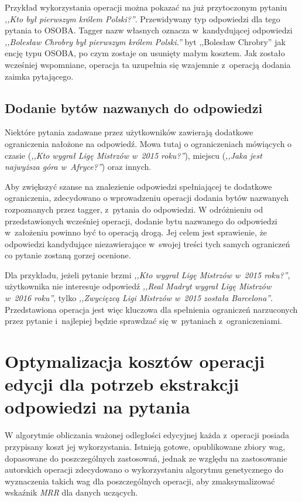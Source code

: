 \documentclass[a4paper, twoside, openright, 12pt]{report}
\begin{document}
            Przykład wykorzystania operacji można pokazać na już przytoczonym pytaniu \emph{,,Kto był pierwszym królem Polski?''}.
            Przewidywany typ odpowiedzi dla tego pytania to OSOBA. Tagger nazw własnych oznacza w~kandydującej odpowiedzi
            \emph{,,Bolesław Chrobry był pierwszym królem Polski.''} byt ,,Bolesław Chrobry'' jak encję typu OSOBA,
            po czym zostaje on usunięty małym kosztem. Jak zostało wcześniej wspomniane, operacja ta uzupełnia się wzajemnie
            z~operacją dodania zaimka pytającego.

        \subsection{Dodanie bytów nazwanych do odpowiedzi}
            Niektóre pytania zadawane przez użytkowników zawierają dodatkowe ograniczenia nałożone na odpowiedź. Mowa tutaj
            o ograniczeniach mówiących o czasie (\emph{,,Kto wygrał Ligę Mistrzów w~2015 roku?''}), miejscu
            (\emph{,,Jaka jest najwyższa góra w~Afryce?''}) oraz innych.

            Aby zwiększyć szanse na znalezienie odpowiedzi spełniającej te dodatkowe ograniczenia, zdecydowano o wprowadzeniu
            operacji dodania bytów nazwanych rozpoznanych przez tagger, z~pytania do odpowiedzi. W odróżnieniu od przedstawionych
            wcześniej operacji, dodanie bytu nazwanego do odpowiedzi w~założeniu powinno być to operacją drogą.
            Jej celem jest sprawienie, że odpowiedzi kandydujące niezawierające w~swojej treści tych samych ograniczeń
            co pytanie zostaną gorzej ocenione.

            Dla przykładu, jeżeli pytanie brzmi \emph{,,Kto wygrał Ligę Mistrzów w~2015 roku?''}, użytkownika nie interesuje
            odpowiedź \emph{,,Real Madryt wygrał Ligę Mistrzów w~2016 roku''}, tylko
            \emph{,,Zwycięzcą Ligi Mistrzów w~2015 została Barcelona''}. Przedstawiona operacja jest więc kluczowa dla
            spełnienia ograniczeń narzuconych przez pytanie i~najlepiej będzie sprawdzać się w~pytaniach z~ograniczeniami.

    \section{Optymalizacja kosztów operacji edycji dla potrzeb ekstrakcji odpowiedzi na pytania}
        W algorytmie obliczania ważonej odległości edycyjnej każda z~operacji posiada przypisany koszt jej wykorzystania.
        Istnieją gotowe, opublikowane zbiory wag, dopasowane do poszczególnych zastosowań, jednak ze względu na zastosowanie
        autorskich operacji zdecydowano o wykorzystaniu algorytmu genetycznego do wyznaczenia takich wag dla poszczególnych
        operacji, aby zmaksymalizować wskaźnik \emph{MRR} dla danych uczących.
\end{document}
